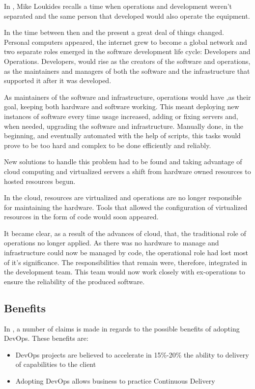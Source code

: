         In  \cite{Loukides2012}, Mike Loukides recalls a time when operations and development weren't separated and the same person that developed would also operate the equipment.  
        
        In the time between then and the present a great deal of things changed. Personal computers appeared, the internet grew to become a global network and two separate roles emerged in the software development life cycle: Developers and Operations. Developers, would rise as the creators of the software and operations, as the maintainers and managers of both the software and the infrastructure that supported it after it was developed.
        
        As maintainers of the software and infrastructure, operations would have ,as their goal, keeping both hardware and software working. This meant deploying new instances of software every time usage increased, adding or fixing servers and, when needed, upgrading the software and infrastructure. Manually done, in the beginning, and eventually automated with the help of scripts, this tasks would prove to be too hard and complex to be done efficiently and reliably. 
        
        New solutions to handle this problem had to be found and taking advantage of cloud computing and virtualized servers a shift from hardware owned resources to hosted resources begun.
        
        In the cloud, resources are virtualized and operations are no longer responsible for maintaining the hardware. Tools that allowed the configuration of virtualized resources in the form of code would soon appeared.
        
        	It became clear, as a result of the advances of cloud, that, the traditional role of operations no longer applied. As there was no hardware to manage and infrastructure could now be managed by code, the operational role had lost most of it's significance. The responsibilities that remain were, therefore, integrated in the development team. This team would now work closely with ex-operations to ensure the reliability of the produced software.   
	
      \subsection{Benefits}
      
      In \cite{Elliot2015}, a number of claims is made in regards to the possible benefits of adopting DevOps.
      These benefits are:
		\begin{itemize}
			\item{DevOps projects are believed to accelerate in 15\%-20\% the ability to delivery of capabilities to the client }
            
            \item{Adopting DevOps allows business to practice Continuous Delivery}
		\end{itemize}
      
